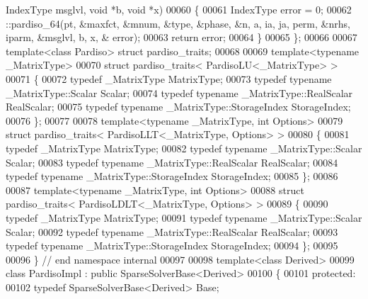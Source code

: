 \begin{DoxyCode}
      IndexType msglvl, \textcolor{keywordtype}{void} *b, \textcolor{keywordtype}{void} *x)
00060     \{
00061       IndexType error = 0;
00062       ::pardiso\_64(pt, &maxfct, &mnum, &type, &phase, &n, a, ia, ja, perm, &nrhs, iparm, &msglvl, b, x, &
      error);
00063       \textcolor{keywordflow}{return} error;
00064     \}
00065   \};
00066 
00067   \textcolor{keyword}{template}<\textcolor{keyword}{class} Pardiso> \textcolor{keyword}{struct }pardiso\_traits;
00068 
00069   \textcolor{keyword}{template}<\textcolor{keyword}{typename} \_MatrixType>
00070   \textcolor{keyword}{struct }pardiso\_traits< PardisoLU<\_MatrixType> >
00071   \{
00072     \textcolor{keyword}{typedef} \_MatrixType MatrixType;
00073     \textcolor{keyword}{typedef} \textcolor{keyword}{typename} \_MatrixType::Scalar Scalar;
00074     \textcolor{keyword}{typedef} \textcolor{keyword}{typename} \_MatrixType::RealScalar RealScalar;
00075     \textcolor{keyword}{typedef} \textcolor{keyword}{typename} \_MatrixType::StorageIndex StorageIndex;
00076   \};
00077 
00078   \textcolor{keyword}{template}<\textcolor{keyword}{typename} \_MatrixType, \textcolor{keywordtype}{int} Options>
00079   \textcolor{keyword}{struct }pardiso\_traits< PardisoLLT<\_MatrixType, Options> >
00080   \{
00081     \textcolor{keyword}{typedef} \_MatrixType MatrixType;
00082     \textcolor{keyword}{typedef} \textcolor{keyword}{typename} \_MatrixType::Scalar Scalar;
00083     \textcolor{keyword}{typedef} \textcolor{keyword}{typename} \_MatrixType::RealScalar RealScalar;
00084     \textcolor{keyword}{typedef} \textcolor{keyword}{typename} \_MatrixType::StorageIndex StorageIndex;
00085   \};
00086 
00087   \textcolor{keyword}{template}<\textcolor{keyword}{typename} \_MatrixType, \textcolor{keywordtype}{int} Options>
00088   \textcolor{keyword}{struct }pardiso\_traits< PardisoLDLT<\_MatrixType, Options> >
00089   \{
00090     \textcolor{keyword}{typedef} \_MatrixType MatrixType;
00091     \textcolor{keyword}{typedef} \textcolor{keyword}{typename} \_MatrixType::Scalar Scalar;
00092     \textcolor{keyword}{typedef} \textcolor{keyword}{typename} \_MatrixType::RealScalar RealScalar;
00093     \textcolor{keyword}{typedef} \textcolor{keyword}{typename} \_MatrixType::StorageIndex StorageIndex;    
00094   \};
00095 
00096 \} \textcolor{comment}{// end namespace internal}
00097 
00098 \textcolor{keyword}{template}<\textcolor{keyword}{class} Derived>
00099 \textcolor{keyword}{class }PardisoImpl : \textcolor{keyword}{public} SparseSolverBase<Derived>
00100 \{
00101   \textcolor{keyword}{protected}:
00102     \textcolor{keyword}{typedef} SparseSolverBase<Derived> Base;

\end{DoxyCode}
